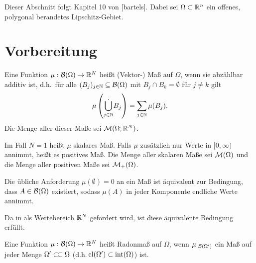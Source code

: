 %


Dieser Abschnitt folgt Kapitel 10 von [bartels].
Dabei sei $\Omega \subset \mathbb{R}^n$ ein offenes, polygonal berandetes
Lipschitz-Gebiet.

\section{Vorbereitung}

\begin{definition}[braides]\label{def:masz}
  Eine Funktion $\mu:\mathcal{B}(\Omega)\to\mathbb{R}^N$ heißt (Vektor-) Maß auf $\Omega$,
  wenn sie abzählbar additiv ist, d.h.\ für alle
  $(B_j)_{j\in\mathbb{N}}\subseteq\mathcal{B}(\Omega)$ mit $B_j \cap B_k = \emptyset$ für
  $j\neq k$ gilt
  \begin{align*}
    \mu\left( \dot{\bigcup_{j\in\mathbb{N}}} B_j  \right) = \sum_{j\in\mathbb{N}} \mu(B_j).
  \end{align*}
  Die Menge aller dieser Maße sei $\mathcal{M}(\Omega;\mathbb{R}^N)$.

  Im Fall $N=1$ heißt $\mu$ skalares Maß. Falls $\mu$ zusätzlich nur Werte in 
  $[0,\infty)$
  annimmt, heißt es positives Maß. Die Menge aller skalaren Maße sei 
  $\mathcal{M}(\Omega)$ und die Menge aller positiven Maße sei 
  $\mathcal{M}_+(\Omega)$.
\end{definition}

\begin{remark}
  Die übliche Anforderung $\mu(\emptyset) = 0$  an ein Maß ist äquivalent zur 
  Bedingung, dass $A\in \mathcal{B}(\Omega)$ existiert, sodass $\mu(A)$ in jeder 
  Komponente endliche Werte annimmt. 

  Da in  als Wertebereich $\mathbb{R}^N$ gefordert wird, ist
  diese äquivalente Bedingung erfüllt.
\end{remark}

\begin{definition}\label{def:radonmasz}
  Eine Funktion $\mu:\mathcal{B}(\Omega)\to\mathbb{R}^N$ heißt Radonmaß auf 
  $\Omega$, wenn $\mu|_{\mathcal{B}(\Omega')}$ ein Maß auf jeder Menge 
  $\Omega'\ssubset \Omega$ (d.h.\,$\operatorname{cl}({\Omega'})\subset \operatorname{int}({\Omega})$) 
  ist.
\end{definition}

